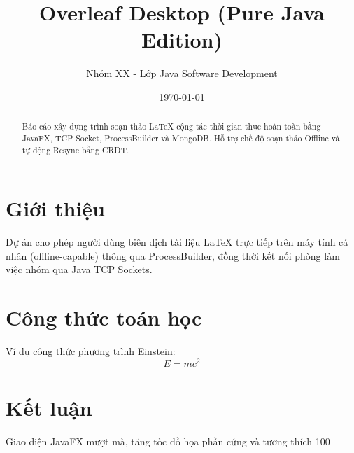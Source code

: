 \documentclass{article}
\title{\textbf{Overleaf Desktop (Pure Java Edition)}}
\author{Nhóm XX - Lớp Java Software Development}
\date{\today}
\begin{document}
\maketitle

\begin{abstract}
Báo cáo xây dựng trình soạn thảo LaTeX cộng tác thời gian thực
hoàn toàn bằng JavaFX, TCP Socket, ProcessBuilder và MongoDB.
Hỗ trợ chế độ soạn thảo Offline và tự động Resync bằng CRDT.
\end{abstract}

\section{Giới thiệu}
Dự án cho phép người dùng biên dịch tài liệu LaTeX trực tiếp trên
máy tính cá nhân (offline-capable) thông qua ProcessBuilder,
đồng thời kết nối phòng làm việc nhóm qua Java TCP Sockets.

\section{Công thức toán học}
Ví dụ công thức phương trình Einstein:
\begin{equation}
    E = mc^2
\end{equation}

\section{Kết luận}
Giao diện JavaFX mượt mà, tăng tốc đồ họa phần cứng và tương thích 100%
\end{document}

